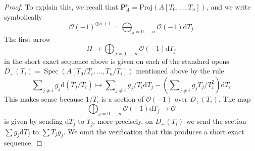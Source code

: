 \documentclass[10pt,a4paper]{amsart}
\theoremstyle{plain}
\theoremstyle{definition}
\theoremstyle{remark}
\numberwithin{equation}{subsection}
\def\Spec{\mathop{\mathrm{Spec}}}
\begin{document}
\begin{proof}
To explain this, we recall that
$\mathbf{P}^n_A = \text{Proj}(A[T_0, \ldots, T_n])$,
and we write symbolically
$$
\mathcal{O}(-1)^{\oplus n + 1} =
\bigoplus\nolimits_{j = 0, \ldots, n} \mathcal{O}(-1) \text{d}T_j
$$
The first arrow
$$
\Omega \to
\bigoplus\nolimits_{j = 0, \ldots, n} \mathcal{O}(-1) \text{d}T_j
$$
in the short exact sequence above
is given on each of the standard opens
$D_+(T_i) = \Spec(A[T_0/T_i, \ldots, T_n/T_i])$
mentioned above by the rule
$$
\sum\nolimits_{j \not = i} g_j \text{d}(T_j/T_i)
\longmapsto
\sum\nolimits_{j \not = i} g_j/T_i \text{d}T_j
- (\sum\nolimits_{j \not = i} g_jT_j/T_i^2) \text{d}T_i
$$
This makes sense because $1/T_i$ is a section of $\mathcal{O}(-1)$
over $D_+(T_i)$. The map
$$
\bigoplus\nolimits_{j = 0, \ldots, n} \mathcal{O}(-1) \text{d}T_j
\to
\mathcal{O}
$$
is given by sending $\text{d}T_j$ to $T_j$, more precisely, on
$D_+(T_i)$ we send the section $\sum g_j \text{d}T_j$ to
$\sum T_jg_j$. We omit the verification that this produces
a short exact sequence.
\end{proof}
\end{document}

